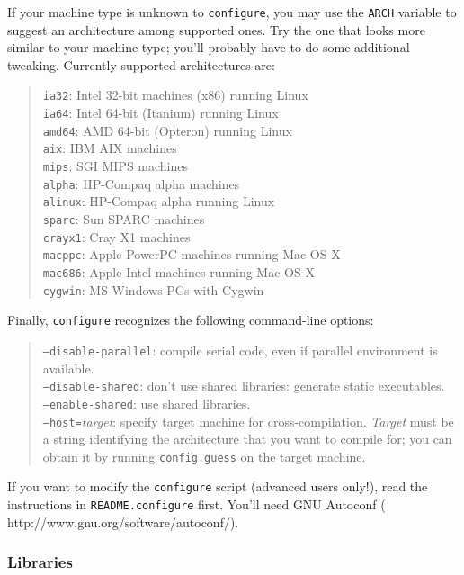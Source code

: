 \documentclass[12pt,a4paper]{article}
\begin{document}
If your machine type is unknown to \texttt{configure}, you may use the
\texttt{ARCH} variable to suggest an architecture among supported
ones.  Try the one that looks more similar to your machine type;
you'll probably have to do some additional tweaking.
Currently supported architectures are:
\begin{quote}
  \texttt{ia32}:    Intel 32-bit machines (x86) running Linux\\
  \texttt{ia64}:    Intel 64-bit (Itanium) running Linux\\
  \texttt{amd64}:   AMD 64-bit (Opteron) running Linux\\
  \texttt{aix}:     IBM AIX machines\\
  \texttt{mips}:    SGI MIPS machines\\
  \texttt{alpha}:   HP-Compaq alpha machines\\
  \texttt{alinux}:  HP-Compaq alpha running Linux\\
  \texttt{sparc}:   Sun SPARC machines\\
  \texttt{crayx1}:  Cray X1 machines\\
  \texttt{macppc}:  Apple PowerPC machines running Mac OS X\\
  \texttt{mac686}:  Apple Intel machines running Mac OS X\\
  \texttt{cygwin}:  MS-Windows PCs with Cygwin
\end{quote}
Finally, \texttt{configure} recognizes the following command-line
options:
\begin{quote}
  \texttt{--disable-parallel}:
    compile serial code, even if parallel environment is available.\\
  \texttt{--disable-shared}:
    don't use shared libraries: generate static executables.\\
  \texttt{--enable-shared}:
    use shared libraries.\\
  \texttt{--host=}\emph{target}:
    specify target machine for cross-compilation.\break
    \emph{Target} must be a string identifying the architecture that
    you want to compile for; you can obtain it by running
    \texttt{config.guess} on the target machine.
\end{quote}
If you want to modify the \texttt{configure} script (advanced users
only!), read the instructions in \texttt{README.configure} first.
You'll need GNU Autoconf
(%
                   {http://www.gnu.org/software/autoconf/}).

\subsubsection{Libraries}
  \label{libraries}
\end{document}
